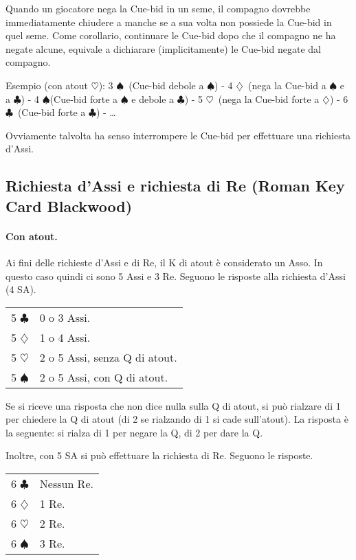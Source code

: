 \documentclass[a4paper,10pt]{article}
\renewcommand{\c}{$\clubsuit$\xspace}
\renewcommand{\d}{$\diamondsuit$\xspace}
\newcommand{\h}{$\heartsuit$\xspace}
\newcommand{\s}{$\spadesuit$\xspace}
\newcommand{\sa}{SA\xspace}
\newcommand{\smallspace}{\vskip0.3cm}
\newenvironment{twocol}
  {\smallspace\noindent\begin{tabular}{l p{0.8\textwidth}}}
  {\end{tabular}\smallspace}
\begin{document}
Quando un giocatore nega la Cue-bid in un seme, il compagno dovrebbe immediatamente chiudere a manche se a sua volta non possiede la Cue-bid in quel seme.
Come corollario, continuare le Cue-bid dopo che il compagno ne ha negate alcune, equivale a dichiarare (implicitamente) le Cue-bid negate dal compagno.

Esempio (con atout \h): 3 \s\  (Cue-bid debole a \s) - 4 \d\ (nega la Cue-bid a \s e a \c) - 4 \s (Cue-bid forte a \s e debole a \c) - 5 \h\ (nega la Cue-bid forte a \d) - 6 \c\ (Cue-bid forte a \c) - \dots

Ovviamente talvolta ha senso interrompere le Cue-bid per effettuare una richiesta d'Assi.


\subsection{Richiesta d'Assi e richiesta di Re (Roman Key Card Blackwood)}

\paragraph{Con atout.} Ai fini delle richieste d'Assi e di Re, il K di atout \`e considerato un Asso. In questo caso quindi ci sono 5 Assi e 3 Re. Seguono le risposte alla richiesta d'Assi (4 \sa).
\begin{twocol}
5 \c & 0 o 3 Assi.\\
5 \d & 1 o 4 Assi.\\
5 \h & 2 o 5 Assi, senza Q di atout.\\
5 \s & 2 o 5 Assi, con Q di atout.\\
\end{twocol}

\noindent Se si riceve una risposta che non dice nulla sulla Q di atout, si può rialzare di 1 per chiedere la Q di atout (di 2 se rialzando di 1 si cade sull'atout). La risposta è la seguente: si rialza di 1 per negare la Q, di 2 per dare la Q.

\smallspace

\noindent Inoltre, con 5 \sa si può effettuare la richiesta di Re. Seguono le risposte.

\begin{twocol}
6 \c & Nessun Re.\\
6 \d & 1 Re.\\
6 \h & 2 Re.\\
6 \s & 3 Re. \\
\end{twocol}
\end{document}
